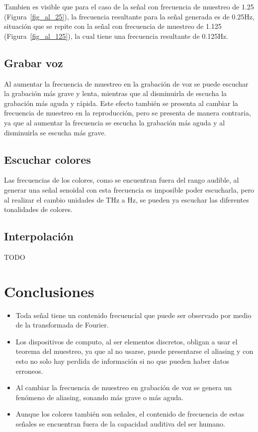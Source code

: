 \documentclass[comsoc, journal]{IEEEtran}
\begin{document}
Tambien es visible que para el caso de la señal con frecuencia de muestreo de 1.25 (Figura~\ref{fig_al_25}), la frecuencia resultante para la señal generada es de 0.25Hz, situación que se repite con la señal con frecuencia de muestreo de 1.125 (Figura~\ref{fig_al_125}), la cual tiene una frecuencia resultante de 0.125Hz.

\subsection{Grabar voz}
Al aumentar la frecuencia de muestreo en la grabación de voz se puede escuchar la grabación más grave y lenta, mientras que al disminuirla de escucha la grabación más aguda y rápida. Este efecto también se presenta al cambiar la frecuencia de muestreo en la reproducción, pero se presenta de manera contraria, ya que al aumentar la frecuencia se escucha la grabación más aguda y al disminuirla se escucha más grave.

\subsection{Escuchar colores}
Las frecuencias de los colores, como se encuentran fuera del rango audible, al generar una señal senoidal con esta frecuencia es imposible poder escucharla, pero al realizar el cambio unidades de THz a Hz, se pueden ya escuchar las diferentes tonalidades de colores.

\subsection{Interpolación}
TODO

\section{Conclusiones}
\begin{itemize}
    \item Toda señal tiene un contenido frecuencial que puede ser observado por medio de la transformada de Fourier.
    \item Los dispositivos de computo, al ser elementos discretos, obligan a usar el teorema del muestreo, ya que al no usarse, puede presentarse el aliasing y con esto no solo hay perdida de información si no que pueden haber datos erroneos.
    \item Al cambiar la frecuencia de muestreo en grabación de voz se genera un fenómeno de aliasing, sonando más grave o más aguda.
    \item Aunque los colores también son señales, el contenido de frecuencia de estas señales se encuentran fuera de la capacidad auditiva del ser humano.
\end{itemize}
\end{document}
